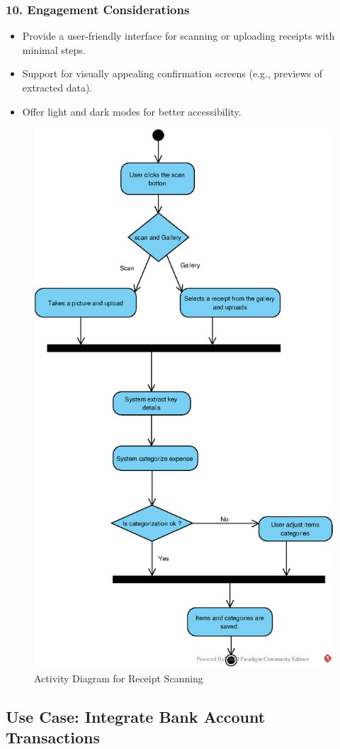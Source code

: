 \subsubsection*{10. Engagement Considerations}
\begin{itemize}
    \item Provide a user-friendly interface for scanning or uploading receipts with minimal steps.
    \item Support for visually appealing confirmation screens (e.g., previews of extracted data).
    \item Offer light and dark modes for better accessibility.
\end{itemize}

\newpage

\begin{figure}[!h]
    \centering
    \includegraphics[width=0.5\linewidth]{eps/Receipt-Scanning.eps}
    \caption{Activity Diagram for Receipt Scanning}
    \label{fig:receiptScanning}
\end{figure}
\newpage


\subsection*{Use Case: Integrate Bank Account Transactions}
\begin{useCase}
\end{useCase}

